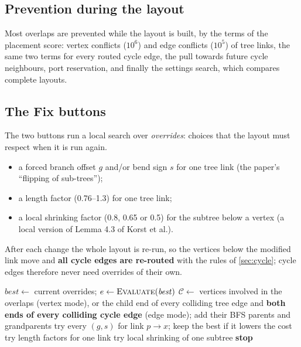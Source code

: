 \documentclass[11pt,a4paper]{article}
\begin{document}
\subsection{Prevention during the layout}
Most overlaps are prevented while the layout is built, by the terms of the placement score: vertex conflicts ($10^6$) and edge conflicts ($10^5$) of tree links, the same two terms for every routed cycle edge, the pull towards future cycle neighbours, port reservation, and finally the settings search, which compares complete layouts.

\subsection{The Fix buttons}
The two buttons run a local search over \emph{overrides}: choices that the layout must respect when it is run again.
\begin{itemize}
  \item a forced branch offset $g$ and/or bend sign $s$ for one tree link (the paper's ``flipping of sub-trees'');
  \item a length factor (0.76--1.3) for one tree link;
  \item a local shrinking factor (0.8, 0.65 or 0.5) for the subtree below a vertex (a local version of Lemma 4.3 of Korst et al.).
\end{itemize}
After each change the whole layout is re-run, so the vertices below the modified link move and \textbf{all cycle edges are re-routed} with the rules of \cref{sec:cycle}; cycle edges therefore never need overrides of their own.

\begin{algorithm}[ht]
\caption{\textsc{Fix}(mode), mode $\in\{$vertex, edge$\}$}
\label{alg:fix}
\begin{algorithmic}[1]
\State $\mathit{best}\gets$ current overrides; $e\gets\textsc{Evaluate}(\mathit{best})$
  \State $\mathcal C\gets$ vertices involved in the overlaps (vertex mode), or the child end of every colliding tree edge and \textbf{both ends of every colliding cycle edge} (edge mode); add their BFS parents and grandparents
   try every $(g,s)$ for link $p\to x$; keep the best if it lowers the cost \EndFor
   try length factors for one link \EndIf
   try local shrinking of one subtree \EndIf
   \textbf{stop} \EndIf
\EndFor
\end{algorithmic}
\end{algorithm}
\end{document}
